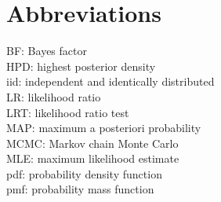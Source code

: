 \documentclass{article}
\begin{document}
	\maketitle

	\newpage

	\tableofcontents
	\newpage

	

	

	

	

	\newpage

	\section*{Abbreviations}

	        BF: Bayes factor\\
       		HPD: highest posterior density\\
        	iid: independent and identically distributed\\
        	LR: likelihood ratio\\
        	LRT: likelihood ratio test\\
        	MAP: maximum a posteriori probability\\
        	MCMC: Markov chain Monte Carlo\\
        	MLE: maximum likelihood estimate\\
        	pdf: probability density function\\
        	pmf: probability mass function\\

	\begin{appendix}
    		\listoffigures
		\listoftables
	\end{appendix}
        
	\newpage
   	
	
    
\end{document}
